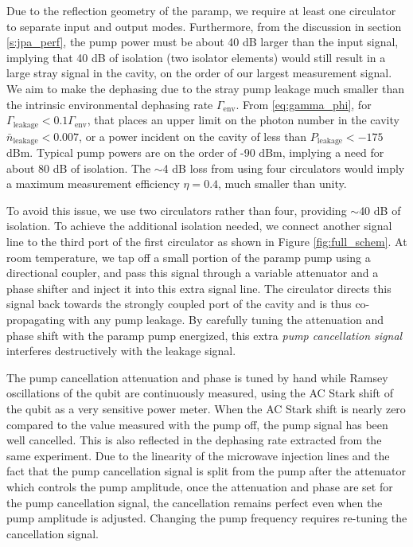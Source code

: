 Due to the reflection geometry of the paramp, we require at least one circulator to separate input and output modes.  Furthermore, from the discussion in section \ref{s:jpa_perf}, the pump power must be about 40 dB larger than the input signal, implying that 40 dB of isolation (two isolator elements) would still result in a large stray signal in the cavity, on the order of our largest measurement signal.  We aim to make the dephasing due to the stray pump leakage much smaller than the intrinsic environmental dephasing rate $\Gamma_\mathrm{env}$.  From \eqref{eq:gamma_phi}, for $\Gamma_\mathrm{leakage} < 0.1 \Gamma_\mathrm{env}$, that places an upper limit on the photon number in the cavity $\bar{n}_\mathrm{leakage} < 0.007$, or a power incident on the cavity of less than $P_\mathrm{leakage} < -175$ dBm.  Typical pump powers are on the order of -90 dBm, implying a need for about 80 dB of isolation.  The $\sim$4 dB loss from using four circulators would imply a maximum measurement efficiency $\eta = 0.4$, much smaller than unity.

To avoid this issue, we use two circulators rather than four, providing $\sim$40 dB of isolation.  To achieve the additional isolation needed, we connect another signal line to the third port of the first circulator as shown in Figure \ref{fig:full_schem}.  At room temperature, we tap off a small portion of the paramp pump using a directional coupler, and pass this signal through a variable attenuator and a phase shifter and inject it into this extra signal line.  The circulator directs this signal back towards the strongly coupled port of the cavity and is thus co-propagating with any pump leakage.  By carefully tuning the attenuation and phase shift with the paramp pump energized, this extra \textit{pump cancellation signal} interferes destructively with the leakage signal.

The pump cancellation attenuation and phase is tuned by hand while Ramsey oscillations of the qubit are continuously measured, using the AC Stark shift of the qubit as a very sensitive power meter.  When the AC Stark shift is nearly zero compared to the value measured with the pump off, the pump signal has been well cancelled.  This is also reflected in the dephasing rate extracted from the same experiment.  Due to the linearity of the microwave injection lines and the fact that the pump cancellation signal is split from the pump after the attenuator which controls the pump amplitude, once the attenuation and phase are set for the pump cancellation signal, the cancellation remains perfect even when the pump amplitude is adjusted.  Changing the pump frequency requires re-tuning the cancellation signal.

